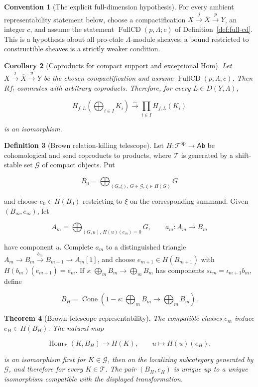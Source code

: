 \documentclass[10pt]{article}
\newtheorem{theorem}{Theorem}[section]
\newtheorem{corollary}[theorem]{Corollary}
\theoremstyle{definition}
\newtheorem{definition}[theorem]{Definition}
\newtheorem{convention}[theorem]{Convention}
\begin{document}
\begin{convention}[The explicit full-dimension hypothesis]
For every ambient representability statement below, choose a compactification
\(X\xrightarrow j\overline X\xrightarrow pY\), an integer \(c\), and assume
the statement \(\operatorname{FullCD}(p,\Lambda;c)\) of
Definition~\ref{def:full-cd}.
This is a hypothesis about all pro-etale \(\Lambda\)-module sheaves; a bound
restricted to constructible sheaves is a strictly weaker condition.
\end{convention}

\begin{corollary}[Coproducts for compact support and exceptional Hom]
Let \(X\xrightarrow j\overline X\xrightarrow pY\) be the chosen
compactification and assume \(\operatorname{FullCD}(p,\Lambda;c)\).  Then
\(Rf_!\) commutes with arbitrary coproducts.  Therefore, for every
\(L\in D(Y,\Lambda)\),

\[
 H_{f,L}\!\left(\bigoplus_{i\in I}K_i\right)
 \xrightarrow{\sim}\prod_{i\in I}H_{f,L}(K_i)
\]

is an isomorphism.
\end{corollary}

\begin{definition}[Brown relation-killing telescope]
Let \(H:\mathcal T^{\mathrm{op}}\to\mathsf{Ab}\) be cohomological and send
coproducts to products, where \(\mathcal T\) is generated by a shift-stable
set \(\mathcal G\) of compact objects.  Put

\[
 B_0=\bigoplus_{(G,\xi),\,G\in\mathcal G,\,\xi\in H(G)}G
\]

and choose \(e_0\in H(B_0)\) restricting to \(\xi\) on the corresponding
summand.  Given \((B_m,e_m)\), let

\[
 A_m=\bigoplus_{(G,u),\,H(u)(e_m)=0}G,
 \qquad a_m:A_m\longrightarrow B_m
\]

have component \(u\).  Complete \(a_m\) to a distinguished triangle
\(A_m\to B_m\xrightarrow{b_m}B_{m+1}\to A_m[1]\), and choose
\(e_{m+1}\in H(B_{m+1})\) with \(H(b_m)(e_{m+1})=e_m\).  If
\(s:\bigoplus_mB_m\to\bigoplus_mB_m\) has components
\(s\iota_m=\iota_{m+1}b_m\), define

\[
 B_H=\operatorname{Cone}\!\left(
 1-s:\bigoplus_mB_m\longrightarrow\bigoplus_mB_m\right).
\]
\end{definition}

\begin{theorem}[Brown telescope representability]
The compatible classes \(e_m\) induce \(e_H\in H(B_H)\).  The natural map

\[
 \operatorname{Hom}_{\mathcal T}(K,B_H)\longrightarrow H(K),
 \qquad u\longmapsto H(u)(e_H),
\]

is an isomorphism first for \(K\in\mathcal G\), then on the localizing
subcategory generated by \(\mathcal G\), and therefore for every
\(K\in\mathcal T\).  The pair \((B_H,e_H)\) is unique up to a unique
isomorphism compatible with the displayed transformation.
\end{theorem}
\end{document}
